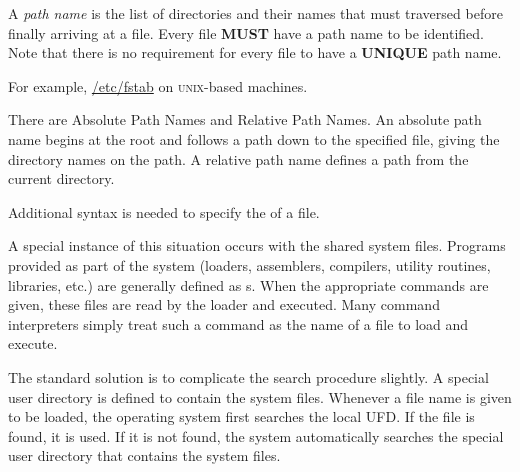 \begin{definition}\label{def:Path_Name}
  A \emph{path name} is the list of directories and their names that must traversed before finally arriving at a file.
  Every file \textbf{MUST} have a path name to be identified.
  Note that there is no requirement for every file to have a \textbf{UNIQUE} path name.

  For example, \url{/etc/fstab} on \textsc{unix}-based machines.

  There are Absolute Path Names and Relative Path Names.
  An absolute path name begins at the root and follows a path down to the specified file, giving the directory names on the path.
  A relative path name defines a path from the current directory.

  \begin{remark}
    Additional syntax is needed to specify the  of a file.
  \end{remark}
\end{definition}

A special instance of this situation occurs with the shared system files.
Programs provided as part of the system (loaders, assemblers, compilers, utility routines, libraries, etc.) are generally defined as s.
When the appropriate commands are given, these files are read by the loader and executed.
Many command interpreters simply treat such a command as the name of a file to load and execute.

The standard solution is to complicate the search procedure slightly.
A special user directory is defined to contain the system files.
Whenever a file name is given to be loaded, the operating system first searches the local UFD.\@
If the file is found, it is used.
If it is not found, the system automatically searches the special user directory that contains the system files.



